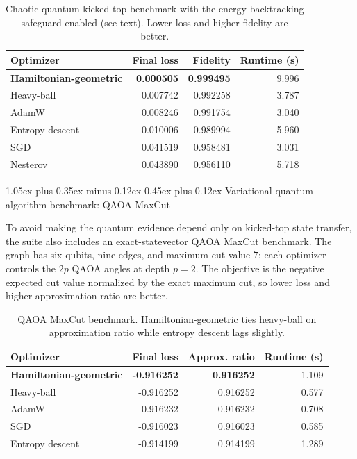 \documentclass[10pt,twocolumn]{article}
\makeatletter
\renewcommand\subsection{\@startsection{subsection}{2}{0pt}%
  {1.05ex plus 0.35ex minus 0.12ex}%
  {0.45ex plus 0.12ex}%
  {\normalsize\bfseries}}
\makeatother
\begin{document}
\begin{table}[t]
\centering
\caption{Chaotic quantum kicked-top benchmark with the energy-backtracking
safeguard enabled (see text). Lower loss and higher fidelity are better.}
\label{tab:quantum}
\begin{tabular}{@{}lrrr@{}}
\toprule
Optimizer & Final loss & Fidelity & Runtime (s) \\
\midrule
\textbf{Hamiltonian-geometric} & \textbf{0.000505} & \textbf{0.999495} & 9.996 \\
Heavy-ball & 0.007742 & 0.992258 & 3.787 \\
AdamW & 0.008246 & 0.991754 & 3.040 \\
Entropy descent & 0.010006 & 0.989994 & 5.960 \\
SGD & 0.041519 & 0.958481 & 3.031 \\
Nesterov & 0.043890 & 0.956110 & 5.718 \\
\bottomrule
\end{tabular}
\end{table}

\subsection{Variational quantum algorithm benchmark: QAOA MaxCut}

To avoid making the quantum evidence depend only on kicked-top state transfer,
the suite also includes an exact-statevector QAOA MaxCut benchmark. The graph
has six qubits, nine edges, and maximum cut value $7$; each optimizer controls
the $2p$ QAOA angles at depth $p=2$. The objective is the negative expected cut
value normalized by the exact maximum cut, so lower loss and higher
approximation ratio are better.

\begin{table}[t]
\centering
\caption{QAOA MaxCut benchmark. Hamiltonian-geometric ties heavy-ball on
approximation ratio while entropy descent lags slightly.}
\label{tab:qaoa}
\begin{tabular}{@{}lrrr@{}}
\toprule
Optimizer & Final loss & Approx. ratio & Runtime (s) \\
\midrule
\textbf{Hamiltonian-geometric} & \textbf{-0.916252} & \textbf{0.916252} & 1.109 \\
Heavy-ball & -0.916252 & 0.916252 & 0.577 \\
AdamW & -0.916232 & 0.916232 & 0.708 \\
SGD & -0.916023 & 0.916023 & 0.585 \\
Entropy descent & -0.914199 & 0.914199 & 1.289 \\
\bottomrule
\end{tabular}
\end{table}
\end{document}
